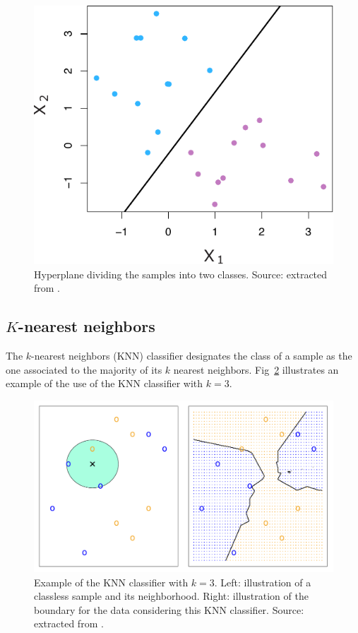 \documentclass[conference]{IEEEtran}
\begin{document}
\begin{figure}
  \centering
  \includegraphics[width=0.8\columnwidth]{../figures/esl_9_5_left}
  \caption{Hyperplane dividing the samples into two classes. Source: extracted from \cite{james2013}.}
  \label{fig:svm}
\end{figure}

\subsection{$K$-nearest neighbors}

The $k$-nearest neighbors (KNN) classifier designates the class of a sample as the one associated to the majority of its $k$ nearest neighbors. Fig~\ref{fig:knn} illustrates an example of the use of the KNN classifier with $k=3$. 
%
\begin{figure}
  \centering
  \includegraphics[width=\columnwidth]{../figures/esl_2_14}
  \caption{Example of the KNN classifier with $k=3$. Left: illustration of a classless sample and its neighborhood. Right: illustration of the boundary for the data considering this KNN classifier. Source: extracted from \cite{james2013}.}
  \label{fig:knn}
\end{figure}
\end{document}
